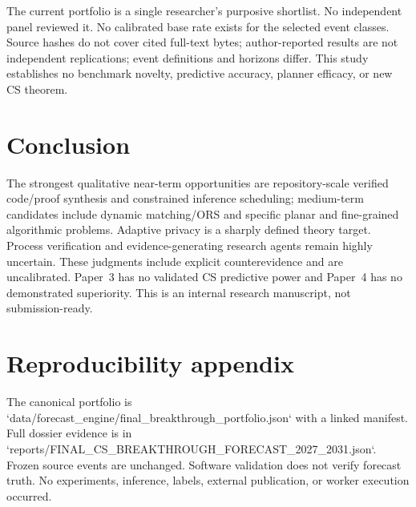 \documentclass[11pt]{article}
\begin{document}
The current portfolio is a single researcher's purposive shortlist. No independent panel reviewed it. No calibrated base rate exists for the selected event classes. Source hashes do not cover cited full-text bytes; author-reported results are not independent replications; event definitions and horizons differ. This study establishes no benchmark novelty, predictive accuracy, planner efficacy, or new CS theorem.

\section{Conclusion}
The strongest qualitative near-term opportunities are repository-scale verified code/proof synthesis and constrained inference scheduling; medium-term candidates include dynamic matching/ORS and specific planar and fine-grained algorithmic problems. Adaptive privacy is a sharply defined theory target. Process verification and evidence-generating research agents remain highly uncertain. These judgments include explicit counterevidence and are uncalibrated. Paper~3 has no validated CS predictive power and Paper~4 has no demonstrated superiority. This is an internal research manuscript, not submission-ready.

\section*{Reproducibility appendix}
The canonical portfolio is `data/forecast\_engine/final\_breakthrough\_portfolio.json` with a linked manifest. Full dossier evidence is in `reports/FINAL\_CS\_BREAKTHROUGH\_FORECAST\_2027\_2031.json`. Frozen source events are unchanged. Software validation does not verify forecast truth. No experiments, inference, labels, external publication, or worker execution occurred.



\end{document}
